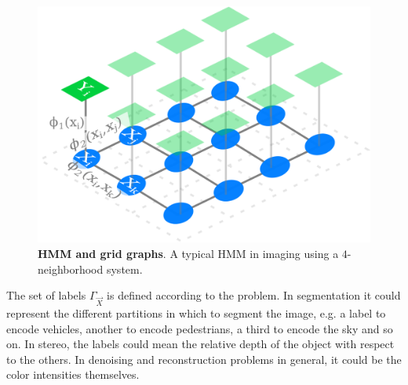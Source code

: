 \begin{figure}
\center
\includegraphics[scale=0.10]{figures/chapter2/mrf/hmm-example.png}
\caption{\textbf{HMM and grid graphs}. A typical HMM in imaging using a $4$-neighborhood system.}
\label{ch2:fig:hmm-multilabeling}
\end{figure}



The set of labels $\Gamma_{\vec{X}}$ is defined according to the problem. In segmentation it could represent the different partitions in which to segment the image, e.g. a label to encode vehicles, another to encode pedestrians, a third to encode the sky and so on. In stereo, the labels could mean the relative depth of the object with respect to the others. In denoising and reconstruction problems in general, it could be the color intensities themselves. 

